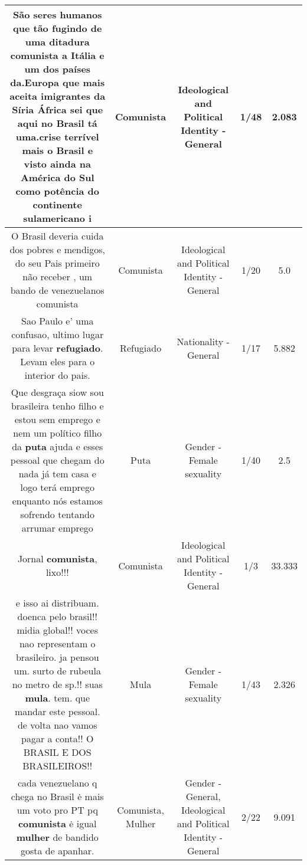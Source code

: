 \documentclass[11pt]{article}
\newlength\mylength
\begin{document}
\begin{center}
\begin{longtable}{|C{.65\mylength}|C{.30\mylength}|C{.12\mylength}|C{.12\mylength}|C{.12\mylength}|}
  \small São seres humanos que tão fugindo de uma ditadura \textbf{comunista} a Itália e um dos países da.Europa que mais aceita imigrantes da Síria África sei que aqui no Brasil tá uma.crise terrível mais o Brasil e visto ainda na América do Sul como potência do continente sulamericano i\normalsize   & Comunista & Ideological and Political Identity - General & 1/48 & 2.083 \\  \hline
  \small O Brasil deveria cuida dos pobres e mendigos, do seu Pais primeiro não receber , um bando de venezuelanos comunista\normalsize   & Comunista & Ideological and Political Identity - General & 1/20 & 5.0 \\  \hline
  \small Sao Paulo e' uma confusao, ultimo lugar para levar \textbf{refugiado}. Levam eles para o interior do pais.\normalsize   & Refugiado & Nationality - General & 1/17 & 5.882 \\  \hline
  \small Que desgraça siow sou brasileira tenho filho e estou sem emprego e nem um político filho da \textbf{puta} ajuda e esses pessoal que chegam do nada já tem casa e logo terá emprego enquanto nós estamos sofrendo tentando arrumar emprego\normalsize   & Puta & Gender - Female sexuality & 1/40 & 2.5 \\  \hline
  \small Jornal \textbf{comunista}, lixo!!!\normalsize   & Comunista & Ideological and Political Identity - General & 1/3 & 33.333 \\  \hline
  \small e isso ai distribuam. doenca pelo brasil!! midia global!! voces nao representam o brasileiro. ja pensou um. surto de rubeula no metro de sp.!! suas \textbf{mula}. tem. que mandar este pessoal. de volta nao vamos pagar a conta!! O BRASIL E DOS BRASILEIROS!!\normalsize   & Mula & Gender - Female sexuality & 1/43 & 2.326 \\  \hline
  \small cada venezuelano q chega no Brasil ė mais um voto pro PT pq \textbf{comunista} ė igual \textbf{mulher} de bandido gosta de apanhar.\normalsize   & Comunista, Mulher & Gender - General, Ideological and Political Identity - General & 2/22 & 9.091 \\  \hline

\end{longtable}
\end{center}
\end{document}
